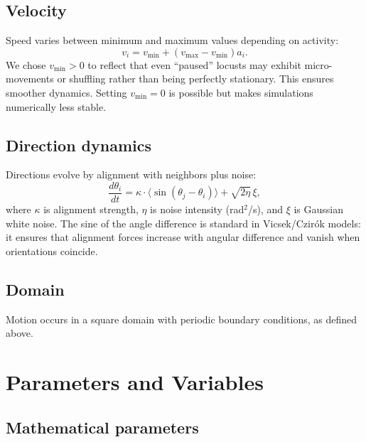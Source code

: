 \documentclass[11pt,a4paper]{article}
\begin{document}
\subsection{Velocity}
Speed varies between minimum and maximum values depending on activity:
\begin{equation}
v_i = v_{\min} + (v_{\max} - v_{\min}) a_i.
\label{eq:velocity}
\end{equation}
We chose $v_{\min} > 0$ to reflect that even ``paused'' locusts may exhibit micro-movements or shuffling rather than being perfectly stationary. This ensures smoother dynamics. Setting $v_{\min}=0$ is possible but makes simulations numerically less stable.

\subsection{Direction dynamics}
Directions evolve by alignment with neighbors plus noise:
\begin{equation}
\frac{d\theta_i}{dt} = \kappa \cdot \langle \sin(\theta_j - \theta_i)\rangle + \sqrt{2\eta}\,\xi,
\label{eq:direction}
\end{equation}
where $\kappa$ is alignment strength, $\eta$ is noise intensity (rad$^2$/s), and $\xi$ is Gaussian white noise.  
The sine of the angle difference is standard in Vicsek/Czirók models: it ensures that alignment forces increase with angular difference and vanish when orientations coincide.

\subsection{Domain}
Motion occurs in a square domain with periodic boundary conditions, as defined above.


\section{Parameters and Variables}

\subsection{Mathematical parameters}
\end{document}
